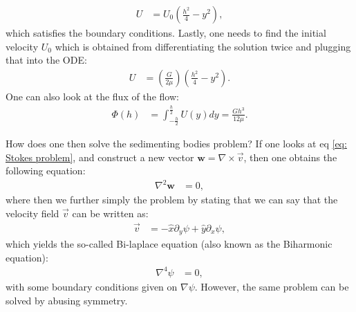 \documentclass[a4paper]{article}
\begin{document}
\begin{align*}
    U &= U_0 \left(\frac{h^2}{4} - y^2\right), 
\end{align*}which satisfies the boundary conditions. Lastly, one needs to find the initial velocity $U_0$ which is obtained from differentiating the solution twice and plugging that into the ODE:
\begin{align*}
    U &= \left(\frac{G}{2\mu}\right)\left(\frac{h^2}{4} - y^2\right).
\end{align*}One can also look at the flux of the flow:
\begin{align*}
    \Phi(h) &= \int_{-\frac{h}{2}}^\frac{h}{2}U(y)dy = \frac{Gh^3}{12\mu}.
\end{align*}

\vspace*{.5cm}\noindent
How does one then solve the sedimenting bodies problem? If one looks at eq \eqref{eq: Stokes problem}, and construct a new vector $\mathbf{w} = \nabla\times\vec{v}$, then one obtains the following equation:
\begin{align*}
    \nabla^2\mathbf{w} &= 0,
\end{align*}where then we further simply the problem by stating that we can say that the velocity field $\vec{v}$ can be written as:
\begin{align*}
    \vec{v} &= -\hat{x}\partial_y \psi + \hat{y}\partial_x\psi,
\end{align*}which yields the so-called Bi-laplace equation (also known as the Biharmonic equation):
\begin{align*}
    \nabla^4\psi &= 0,
\end{align*}with some boundary conditions given on $\nabla\psi$. However, the same problem can be solved by abusing symmetry.
\end{document}
